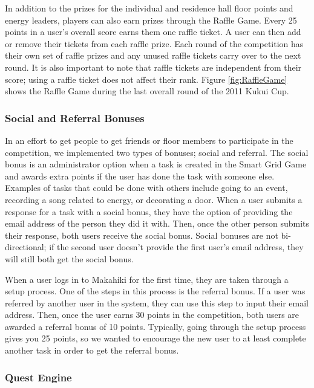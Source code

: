 \documentclass{acm_proc_article-sp}
\begin{document}
In addition to the prizes for the individual and residence hall floor points and energy leaders, players can also earn prizes through the Raffle Game. Every 25 points in a user's overall score earns them one raffle ticket. A user can then add or remove their tickets from each raffle prize. Each round of the competition has their own set of raffle prizes and any unused raffle tickets carry over to the next round. It is also important to note that raffle tickets are independent from their score; using a raffle ticket does not affect their rank. Figure \ref{fig:RaffleGame} shows the Raffle Game during the last overall round of the 2011 Kukui Cup.

\subsubsection{Social and Referral Bonuses}

In an effort to get people to get friends or floor members to participate in the competition, we implemented two types of bonuses; social and referral. The social bonus is an administrator option when a task is created in the Smart Grid Game and awards extra points if the user has done the task with someone else. Examples of tasks that could be done with others include going to an event, recording a song related to energy, or decorating a door. When a user submits a response for a task with a social bonus, they have the option of providing the email address of the person they did it with. Then, once the other person submits their response, both users receive the social bonus. Social bonuses are not bi-directional; if the second user doesn't provide the first user's email address, they will still both get the social bonus.

When a user logs in to Makahiki for the first time, they are taken through a setup process. One of the steps in this process is the referral bonus. If  a user was referred by another user in the system, they can use this step to input their email address. Then, once the user earns 30 points in the competition, both users are awarded a referral bonus of 10 points. Typically, going through the setup process gives you 25 points, so we wanted to encourage the new user to at least complete another task in order to get the referral bonus.

\subsubsection{Quest Engine}
\end{document}
